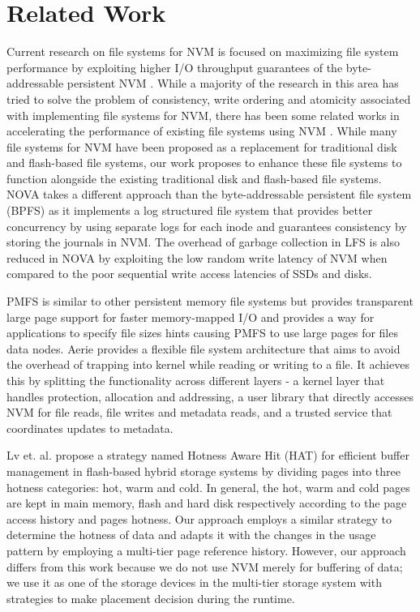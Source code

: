 
\section{Related Work}

Current research on file systems for NVM is focused on maximizing file system performance by exploiting higher I/O throughput guarantees of the byte-addressable persistent NVM \cite{c10,c8,c3,c5}. While a majority of the research in this area has tried to solve the problem of consistency, write ordering and atomicity associated with implementing file systems for NVM, there has been some related works in accelerating the performance of existing file systems using NVM \cite{c11, c12}. While many file systems for NVM have been proposed as a replacement for traditional disk and flash-based file systems, our work proposes to enhance these file systems to function alongside the existing traditional disk and flash-based file systems. 
NOVA \cite{c8} takes a different approach than the byte-addressable persistent file system (BPFS) \cite{c10} as it implements a log structured file system that provides better concurrency by using separate logs for each inode and guarantees consistency by storing the journals in NVM. The overhead of garbage collection in LFS is also reduced in NOVA by exploiting the low random write latency of NVM when compared to the poor sequential write access latencies of SSDs and disks.

PMFS \cite{c3} is similar to other persistent memory file systems but provides transparent large page support for faster memory-mapped I/O and provides a way for applications to specify file sizes hints causing PMFS to use large pages for files data nodes. Aerie \cite{c5} provides a flexible file system architecture that aims to avoid the overhead of trapping into kernel while reading or writing to a file. It achieves this by splitting the functionality across different layers - a kernel layer that handles protection, allocation and addressing, a user library that directly accesses NVM for file reads, file writes and metadata reads, and a trusted service that coordinates updates to metadata.

Lv et. al. \cite{c1} propose a strategy named Hotness Aware Hit (HAT) for efficient buffer management in flash-based hybrid storage systems by dividing pages into three hotness categories: hot, warm and cold. In general, the hot, warm and cold pages are kept in main memory, flash and hard disk respectively according to the page access history and pages hotness. Our approach employs a similar strategy to determine the hotness of data and adapts it with the changes in the usage pattern by employing a multi-tier page reference history. However, our approach differs from this work because we do not use NVM merely for buffering of data; we use it as one of the storage devices in the multi-tier storage system with strategies to make placement decision during the runtime. 

